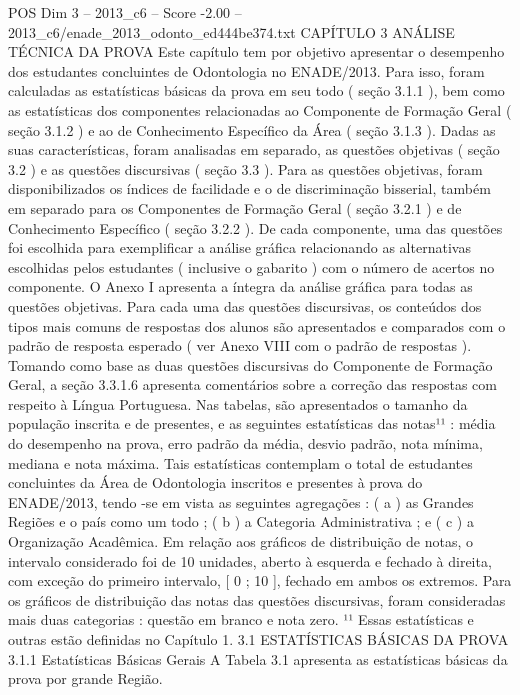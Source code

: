 \begin{textsample}{POS Dim 3 – 2013\_c6 – Score -2.00 – 2013\_c6/enade\_2013\_odonto\_ed444be374.txt}  \label{ex:f3_pos_233}
CAPÍTULO 3 ANÁLISE TÉCNICA DA PROVA Este capítulo tem por objetivo apresentar o desempenho dos estudantes concluintes de Odontologia no ENADE/2013.
Para isso, foram calculadas as estatísticas básicas da prova em seu todo ( seção 3.1.1 ), bem como as estatísticas dos componentes relacionadas ao Componente de Formação Geral ( seção 3.1.2 ) e ao de Conhecimento Específico da Área ( seção 3.1.3 ).
Dadas as suas características, foram analisadas em separado, as questões objetivas ( seção 3.2 ) e as questões discursivas ( seção 3.3 ).
Para as questões objetivas, foram disponibilizados os índices de facilidade e o de discriminação bisserial, também em separado para os Componentes de Formação Geral ( seção 3.2.1 ) e de Conhecimento Específico ( seção 3.2.2 ).
De cada componente, uma das questões foi escolhida para exemplificar a análise gráfica relacionando as alternativas escolhidas pelos estudantes ( inclusive o gabarito ) com o número de acertos no componente.
O Anexo I apresenta a íntegra da análise gráfica para todas as questões objetivas.
Para cada uma das questões discursivas, os conteúdos dos tipos mais comuns de respostas dos alunos são apresentados e comparados com o padrão de resposta esperado ( ver Anexo VIII com o padrão de respostas ).
Tomando como base as duas questões discursivas do Componente de Formação Geral, a seção 3.3.1.6 apresenta comentários sobre a correção das respostas com respeito à Língua Portuguesa.
Nas tabelas, são apresentados o tamanho da população inscrita e de presentes, e as seguintes estatísticas das notas¹¹ : média do desempenho na prova, erro padrão da média, desvio padrão, nota mínima, mediana e nota máxima.
Tais estatísticas contemplam o total de estudantes concluintes da Área de Odontologia inscritos e presentes à prova do ENADE/2013, tendo -se em vista as seguintes agregações : ( a ) as Grandes Regiões e o país como um todo ; ( b ) a Categoria Administrativa ; e ( c ) a Organização Acadêmica.
Em relação aos gráficos de distribuição de notas, o intervalo considerado foi de 10 unidades, aberto à esquerda e fechado à direita, com exceção do primeiro intervalo, [ 0 ; 10 ], fechado em ambos os extremos.
Para os gráficos de distribuição das notas das questões discursivas, foram consideradas mais duas categorias : questão em branco e nota zero. ¹¹ Essas estatísticas e outras estão definidas no Capítulo 1. 3.1 ESTATÍSTICAS BÁSICAS DA PROVA 3.1.1 Estatísticas Básicas Gerais A Tabela 3.1 apresenta as estatísticas básicas da prova por grande Região.

\end{textsample}
